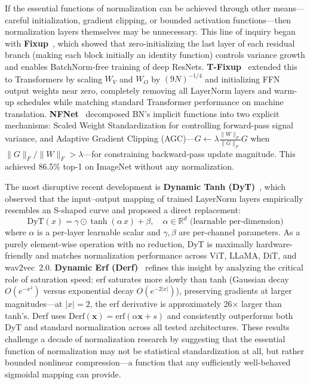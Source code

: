 If the essential functions of normalization can be achieved through other means---careful initialization, gradient clipping, or bounded activation functions---then normalization layers themselves may be unnecessary.
This line of inquiry began with \textbf{Fixup}~\cite{zhang2019fixup}, which showed that zero-initializing the last layer of each residual branch (making each block initially an identity function) controls variance growth and enables BatchNorm-free training of deep ResNets.
\textbf{T-Fixup}~\cite{huang2020tfixup} extended this to Transformers by scaling $W_V$ and $W_O$ by $(9N)^{-1/4}$ and initializing FFN output weights near zero, completely removing all LayerNorm layers and warm-up schedules while matching standard Transformer performance on machine translation.
\textbf{NFNet}~\cite{brock2021high} decomposed BN's implicit functions into two explicit mechanisms: Scaled Weight Standardization for controlling forward-pass signal variance, and Adaptive Gradient Clipping (AGC)---$G \leftarrow \lambda \frac{\|W\|_F}{\|G\|_F} G$ when $\|G\|_F / \|W\|_F > \lambda$---for constraining backward-pass update magnitude.
This achieved 86.5\% top-1 on ImageNet without any normalization.

The most disruptive recent development is \textbf{Dynamic Tanh (DyT)}~\cite{zhu2025transformers}, which observed that the input--output mapping of trained LayerNorm layers empirically resembles an S-shaped curve and proposed a direct replacement:
\begin{equation}
    \mathrm{DyT}(x) = \gamma \odot \tanh(\alpha \, x) + \beta, \quad \alpha \in \mathbb{R}^d \text{ (learnable per-dimension)}
    \label{eq:dyt}
\end{equation}
where $\alpha$ is a per-layer learnable scalar and $\gamma, \beta$ are per-channel parameters.
As a purely element-wise operation with no reduction, DyT is maximally hardware-friendly and matches normalization performance across ViT, LLaMA, DiT, and wav2vec~2.0.
\textbf{Dynamic Erf (Derf)}~\cite{chen2025stronger} refines this insight by analyzing the critical role of saturation speed: erf saturates more slowly than tanh (Gaussian decay $O(e^{-x^2})$ versus exponential decay $O(e^{-2|x|})$), preserving gradients at larger magnitudes---at $|x|=2$, the erf derivative is approximately 26$\times$ larger than tanh's.
Derf uses $\text{Derf}(\mathbf{x}) = \text{erf}(\alpha \mathbf{x} + s)$ and consistently outperforms both DyT and standard normalization across all tested architectures.
These results challenge a decade of normalization research by suggesting that the essential function of normalization may not be statistical standardization at all, but rather bounded nonlinear compression---a function that any sufficiently well-behaved sigmoidal mapping can provide.

